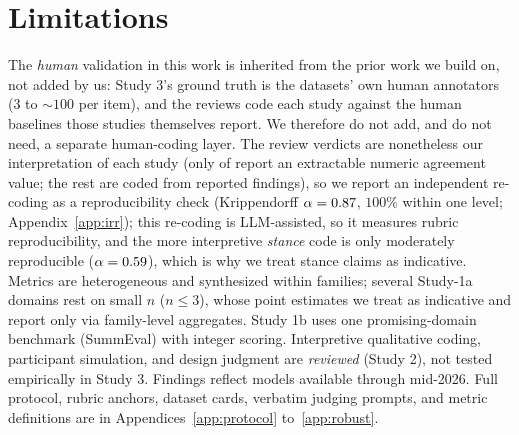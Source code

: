 \section{Limitations}
The \emph{human} validation in this work is inherited from the prior work we build on, not added by us: Study 3's
ground truth is the datasets' own human annotators (3 to ${\sim}100$ per item), and the reviews code each study
against the human baselines those studies themselves report. We therefore do not add, and do not need, a separate
human-coding layer. The review verdicts are nonetheless our interpretation of each study (only \Nnumeric{} of
\Nstudies{} report an extractable numeric agreement value; the rest are coded from reported findings), so we report
an independent re-coding as a reproducibility check (Krippendorff $\alpha=0.87$, $100\%$ within one level;
Appendix~\ref{app:irr}); this re-coding is LLM-assisted, so it measures rubric reproducibility, and the more
interpretive \emph{stance} code is only moderately reproducible ($\alpha=0.59$), which is why we treat
stance claims as indicative. Metrics are heterogeneous and synthesized within families; several Study-1a
domains rest on small $n$ ($n{\le}3$), whose point estimates we treat as indicative and report only via family-level
aggregates. Study 1b uses one promising-domain benchmark (SummEval) with integer scoring. Interpretive qualitative
coding, participant simulation, and design judgment are \emph{reviewed} (Study 2), not tested empirically in Study 3.
Findings reflect models available through mid-2026. Full protocol, rubric anchors,
dataset cards, verbatim judging prompts, and metric definitions are in Appendices~\ref{app:protocol}
to~\ref{app:robust}.

